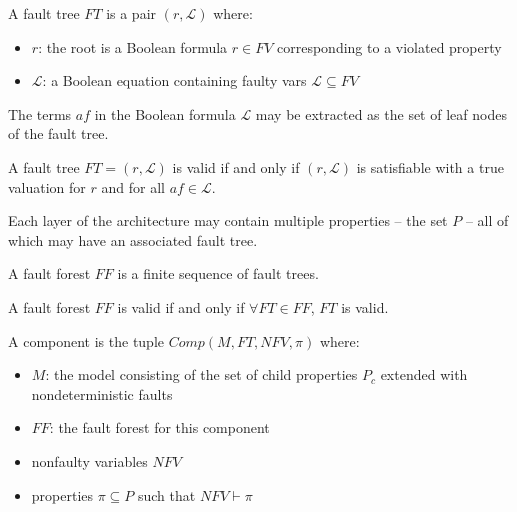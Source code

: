 \begin{definition}
A fault tree $\mathit{FT}$ is a pair $(r, \mathcal{L})$ where:
\begin{itemize}
\item[] $r$: the root is a Boolean formula $r \in FV$ corresponding to a violated property
\item[] $\mathcal{L}$: a Boolean equation containing faulty vars $\mathcal{L} \subseteq \mathit{FV}$
\end{itemize}
\end{definition}

The terms $\mathit{af}$  in the Boolean formula $\mathcal{L}$ may be extracted as the set of leaf nodes of the fault tree. 

\begin{definition} 
A fault tree $FT = (r, \mathcal{L})$ is valid if and only if $(r, \mathcal{L})$ is satisfiable with a true valuation for $r$ and for all $\mathit{af} \in \mathcal{L}$. 
\end{definition}


Each layer of the architecture may contain multiple properties -- the set $P$ --  all of which may have an associated fault tree. 

\begin{definition}
A fault forest $\mathit{FF}$ is a finite sequence of fault trees.
\end{definition}

\begin{definition}
A fault forest $\mathit{FF}$ is valid if and only if $\forall \mathit{FT} \in \mathit{FF}$, $\mathit{FT}$ is valid.
\end{definition}


\begin{definition}
A component is the tuple $\mathit{Comp}(M, \mathit{FT}, \mathit{NFV}, \pi)$ where:
\begin{itemize}[label=\textbullet]
\item $M$: the model consisting of the set of child properties $P_c$ extended with nondeterministic faults
\item $\mathit{FF}$: the fault forest for this component
\item nonfaulty variables $\mathit{NFV}$
\item properties $\pi \subseteq P$ such that $\mathit{NFV} \vdash \pi$
\end{itemize}
\end{definition}

